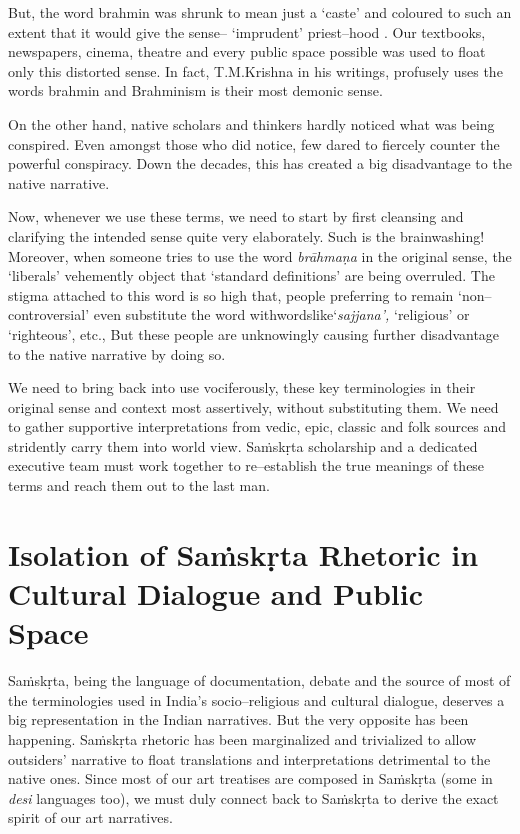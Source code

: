 But, the word brahmin was shrunk to mean just a ‘caste’ and coloured to such an extent that it would give the sense– ‘imprudent’ priest–hood . Our textbooks, newspapers, cinema, theatre and every public space possible was used to float only this distorted sense. In fact, T.M.Krishna in his writings, profusely uses the words brahmin and Brahminism is their most demonic sense.

On the other hand, native scholars and thinkers hardly noticed what was being conspired. Even amongst those who did notice, few dared to fiercely counter the powerful conspiracy. Down the decades, this has created a big disadvantage to the native narrative.

Now, whenever we use these terms, we need to start by first cleansing and clarifying the intended sense quite very elaborately. Such is the brainwashing! Moreover, when someone tries to use the word \textit{brāhmaṇa} in the original sense, the ‘liberals’ vehemently object that ‘standard definitions’ are being overruled. The stigma attached to this word is so high that, people preferring to remain ‘non–controversial’ even substitute the word withwordslike‘\textit{sajjana’,} ‘religious’ or ‘righteous’, etc., But these people are unknowingly causing further disadvantage to the native narrative by doing so.

We need to bring back into use vociferously, these key terminologies in their original sense and context most assertively, without substituting them. We need to gather supportive interpretations from vedic, epic, classic and folk sources and stridently carry them into world view. Saṁskṛta scholarship and a dedicated executive team must work together to re–establish the true meanings of these terms and reach them out to the last man.


\section*{Isolation of Saṁskṛta Rhetoric in Cultural Dialogue and Public Space}

Saṁskṛta, being the language of documentation, debate and the source of most of the terminologies used in India’s socio–religious and cultural dialogue, deserves a big representation in the Indian narratives. But the very opposite has been happening. Saṁskṛta rhetoric has been marginalized and trivialized to allow outsiders’  narrative to float translations and interpretations detrimental to the native ones. Since most of our art treatises are composed in Saṁskṛta (some in \textit{desi} languages too), we must duly connect back to Saṁskṛta to derive the exact spirit of our art narratives.

